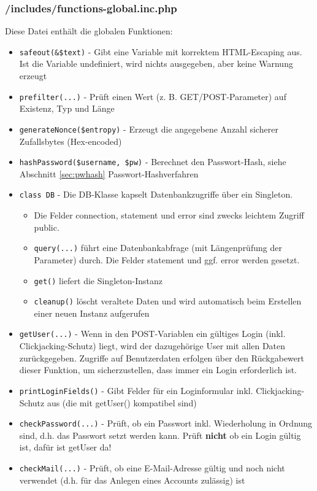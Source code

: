 \documentclass[parskip=half]{scrartcl}
\begin{document}
\subsubsection{/includes/functions-global.inc.php}
Diese Datei enthält die globalen Funktionen:
\begin{itemize}
	\item \texttt{safeout(\&\$text)} - Gibt eine Variable mit korrektem HTML-Escaping aus. Ist die Variable undefiniert, wird nichts ausgegeben, aber keine Warnung erzeugt
	\item \texttt{prefilter(...)} - Prüft einen Wert (z. B. GET/POST-Parameter) auf Existenz, Typ und Länge
	\item \texttt{generateNonce(\$entropy)} - Erzeugt die angegebene Anzahl sicherer Zufallsbytes (Hex-encoded)
	\item \texttt{hashPassword(\$username, \$pw)} - Berechnet den Passwort-Hash, siehe Abschnitt \ref{sec:pwhash} Passwort-Hashverfahren
	\item \texttt{class DB} - Die DB-Klasse kapselt Datenbankzugriffe über ein Singleton.
	\begin{itemize}
		\item Die Felder connection, statement und error sind zwecks leichtem Zugriff public.
		\item \texttt{query(...)} führt eine Datenbankabfrage (mit Längenprüfung der Parameter) durch. Die Felder statement und ggf. error werden gesetzt.
		\item \texttt{get()} liefert die Singleton-Instanz
		\item \texttt{cleanup()} löscht veraltete Daten und wird automatisch beim Erstellen einer neuen Instanz aufgerufen
	\end{itemize}
	\item \texttt{getUser(...)} - Wenn in den POST-Variablen ein gültiges Login (inkl. Clickjacking-Schutz) liegt, wird der dazugehörige User mit allen Daten zurückgegeben.
	                           Zugriffe auf Benutzerdaten erfolgen über den Rückgabewert dieser Funktion, um sicherzustellen, dass immer ein Login erforderlich ist.
	\item \texttt{printLoginFields()} - Gibt Felder für ein Loginformular inkl. Clickjacking-Schutz aus (die mit getUser() kompatibel sind)
	\item \texttt{checkPassword(...)} - Prüft, ob ein Passwort inkl. Wiederholung in Ordnung sind, d.h. das Passwort setzt werden kann.
										Prüft \textbf{nicht} ob ein Login gültig ist, dafür ist getUser da!
	\item \texttt{checkMail(...)} - Prüft, ob eine E-Mail-Adresse gültig und noch nicht verwendet (d.h. für das Anlegen eines Accounts zulässig) ist
\end{itemize}
\end{document}
